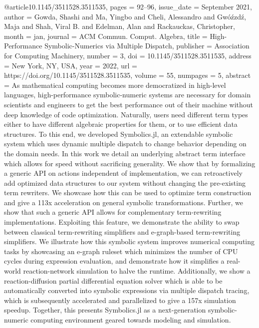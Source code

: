 @article{10.1145/3511528.3511535,
 pages         = {92–96},
 issue_date    = {September 2021},
 author        = {Gowda, Shashi and Ma, Yingbo and Cheli, Alessandro and Gw\'{o}\'{z}zd\'{z}, Maja and Shah, Viral B. and Edelman, Alan and Rackauckas, Christopher},
 month         = {jan},
 journal       = {ACM Commun. Comput. Algebra},
 title         = {High-Performance Symbolic-Numerics via Multiple Dispatch},
 publisher     = {Association for Computing Machinery},
 number        = {3},
 doi           = {10.1145/3511528.3511535},
 address       = {New York, NY, USA},
 year          = {2022},
 url           = {https://doi.org/10.1145/3511528.3511535},
 volume        = {55},
 numpages      = {5},
 abstract      = {As mathematical computing becomes more democratized in high-level languages, high-performance symbolic-numeric systems are necessary for domain scientists and engineers to get the best performance out of their machine without deep knowledge of code optimization. Naturally, users need different term types either to have different algebraic properties for them, or to use efficient data structures. To this end, we developed Symbolics.jl, an extendable symbolic system which uses dynamic multiple dispatch to change behavior depending on the domain needs. In this work we detail an underlying abstract term interface which allows for speed without sacrificing generality. We show that by formalizing a generic API on actions independent of implementation, we can retroactively add optimized data structures to our system without changing the pre-existing term rewriters. We showcase how this can be used to optimize term construction and give a 113x acceleration on general symbolic transformations. Further, we show that such a generic API allows for complementary term-rewriting implementations. Exploiting this feature, we demonstrate the ability to swap between classical term-rewriting simplifiers and e-graph-based term-rewriting simplifiers. We illustrate how this symbolic system improves numerical computing tasks by showcasing an e-graph ruleset which minimizes the number of CPU cycles during expression evaluation, and demonstrate how it simplifies a real-world reaction-network simulation to halve the runtime. Additionally, we show a reaction-diffusion partial differential equation solver which is able to be automatically converted into symbolic expressions via multiple dispatch tracing, which is subsequently accelerated and parallelized to give a 157x simulation speedup. Together, this presents Symbolics.jl as a next-generation symbolic-numeric computing environment geared towards modeling and simulation.}
}

